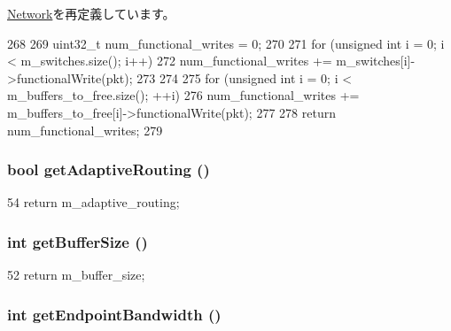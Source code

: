 \hyperlink{classNetwork_a31a4b7e2a90a59a684d84d1284683986}{Network}を再定義しています。


\begin{DoxyCode}
268 {
269     uint32_t num_functional_writes = 0;
270 
271     for (unsigned int i = 0; i < m_switches.size(); i++) {
272         num_functional_writes += m_switches[i]->functionalWrite(pkt);
273     }
274 
275     for (unsigned int i = 0; i < m_buffers_to_free.size(); ++i) {
276         num_functional_writes += m_buffers_to_free[i]->functionalWrite(pkt);
277     }
278     return num_functional_writes;
279 }
\end{DoxyCode}
\hypertarget{classSimpleNetwork_aec4d81a042f35c92fa51a3721a8ed203}{
\subsubsection[{getAdaptiveRouting}]{\setlength{\rightskip}{0pt plus 5cm}bool getAdaptiveRouting ()}}
\label{classSimpleNetwork_aec4d81a042f35c92fa51a3721a8ed203}



\begin{DoxyCode}
54 {return m_adaptive_routing; }
\end{DoxyCode}
\hypertarget{classSimpleNetwork_adaa0495495ece419f5911bc378971502}{
\subsubsection[{getBufferSize}]{\setlength{\rightskip}{0pt plus 5cm}int getBufferSize ()}}
\label{classSimpleNetwork_adaa0495495ece419f5911bc378971502}



\begin{DoxyCode}
52 { return m_buffer_size; }
\end{DoxyCode}
\hypertarget{classSimpleNetwork_a51a3a1351914cb6da4e32265806c3b65}{
\subsubsection[{getEndpointBandwidth}]{\setlength{\rightskip}{0pt plus 5cm}int getEndpointBandwidth ()}}
\label{classSimpleNetwork_a51a3a1351914cb6da4e32265806c3b65}



